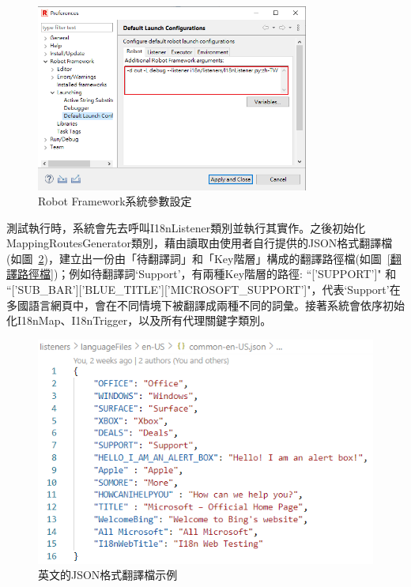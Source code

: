 \begin{figure}[H]
    \centering
    \includegraphics[width= 0.8\textwidth]{../論文截圖/3-1-3-1 設定系統參數.png}
    \caption{Robot Framework系統參數設定}
    \label{rfSysArgsSetting}
\end{figure}
測試執行時，系統會先去呼叫I18nListener類別並執行其實作。之後初始化MappingRoutesGenerator類別，藉由讀取由使用者自行提供的JSON格式翻譯檔(如圖~\ref{英文的JSON格式翻譯檔示例})，建立出一份由「待翻譯詞」和「Key階層」構成的翻譯路徑檔(如圖~\ref{翻譯路徑檔})；例如待翻譯詞‘Support’，有兩種Key階層的路徑: “['SUPPORT']" 和 “['SUB\_BAR']['BLUE\_TITLE']['MICROSOFT\_SUPPORT']"，代表‘Support’在多國語言網頁中，會在不同情境下被翻譯成兩種不同的詞彙。接著系統會依序初始化I18nMap、I18nTrigger，以及所有代理關鍵字類別。

\begin{figure}[H]
    \centering
    \includegraphics[width= .7\textwidth]{../論文截圖/3-1-3-2 JSON格式翻譯檔.png}
    \caption{英文的JSON格式翻譯檔示例}
    \label{英文的JSON格式翻譯檔示例}
\end{figure}


